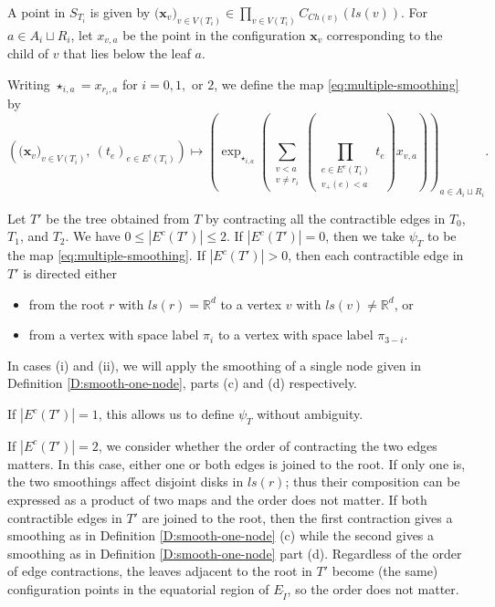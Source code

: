 \documentclass[11pt]{article}
\theoremstyle{definition}
\theoremstyle{remark}
\def\wt#1{\widetilde{#1}}
\def\R{\mathbb{R}}
\def\rI{{\mathring{I}}}
\def\Ch{{{Ch}}}
\def\bx{\mathbf{x}}
\begin{document}
A point in $S_{T_i}$ is given by $\big( \bx_v \big)_{v \in V(T_i)}\in \prod_{v \in V(T_i)} C_{\Ch(v)}(ls(v))$.
For $a \in A_i \sqcup R_i$, let $x_{v,a}$ be the point in the configuration $\bx_v$ corresponding to the child of $v$ that lies below the leaf $a$.

Writing $\star_{i,a}=x_{r_i,a}$ for $i=0,1,$ or $2$, we define the map \eqref{eq:multiple-smoothing} by 
\[
\left( \big( \bx_v \big)_{v \in V(T_i)}, \ (t_e)_{e \in E^c(T_i)} \right) 
\mapsto
\left(
\exp_{\star_{i,a}} \left( \sum_{\substack{v < a\\ v \neq r_i}} \left( \prod_{\substack{e \in E^c(T_i)\\ v_+(e)<a}} t_e \right) x_{v,a} \right) \right)_{a \in A_i \sqcup R_i}.
\]

Let $T'$ be the tree obtained from $T$ by contracting all the contractible edges in $T_0$, $T_1$, and $T_2$.  
We have  $0 \leq |E^c(T')| \leq 2$.  If $|E^c(T')|=0$, then we take $\psi_T$ to be the map \eqref{eq:multiple-smoothing}.  If $|E^c(T')|>0$, then each contractible edge in $T'$ is directed either 
\begin{itemize}
\item[(i)] from the root $r$ with $ls(r)=\R^d$ to a vertex $v$ with $ls(v)\neq \R^d$, or 
\item[(ii)] from a vertex with space label $\pi_i$ to a vertex with space label $\pi_{3-i}$.
\end{itemize}
In cases (i) and (ii), we will apply the smoothing of a single node given in Definition \ref{D:smooth-one-node}, parts (c) and (d) respectively.  

If $|E^c(T')|=1$, this allows us to define $\psi_T$ without ambiguity.

If $|E^c(T')|=2$, we consider whether the order of contracting the two edges matters.  In this case, either one or both edges is joined to the root.  If only one is, the two smoothings affect disjoint disks in $ls(r)$; thus their composition can be expressed as a product of two maps and the order does not matter.  If both contractible edges in $T'$ are joined to the root, then the first contraction gives a smoothing as in Definition \ref{D:smooth-one-node} (c) while the second gives a smoothing as in Definition \ref{D:smooth-one-node} part (d).  Regardless of the order of edge contractions, the leaves adjacent to the root in $T'$ become (the same) configuration points in the equatorial region of $E_\rI$, so the order does not matter.  
\end{document}
